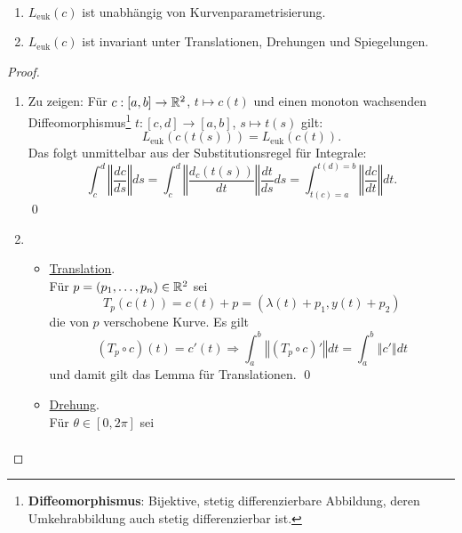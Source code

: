 \begin{lemma}
  \label{lm:leuklinvarianz} \
  \begin{enumerate}
    \item $ L_\text{euk}(c) $ ist unabhängig von Kurvenparametrisierung.
    \item $ L_\text{euk}(c) $ ist invariant unter Translationen, Drehungen und Spiegelungen.
  \end{enumerate}
  \begin{proof}
    \
    \begin{enumerate}
      \item Zu zeigen: Für $ c: [a,b] \to \mathbb{R}^2 $, $ t \mapsto c(t) $ und einen monoton wachsenden Diffeomorphismus\footnote{\textbf{Diffeomorphismus}: Bijektive, stetig differenzierbare Abbildung, deren Umkehrabbildung auch stetig differenzierbar ist.} $ t: [c, d] \to [a,b] $, $ s \mapsto t(s) $ gilt:
      \begin{equation*}
        L_\text{euk}(c(t(s))) = L_\text{euk}(c(t))\text{.}
      \end{equation*}
      Das folgt unmittelbar aus der Substitutionsregel für Integrale:
      \begin{equation*}
        \int_c^d \left\Vert \frac{dc}{ds} \right\Vert ds = \int_c^d \left\Vert \frac{d_c(t(s))}{dt} \right\Vert \frac{dt}{ds}ds = \int_{t(c) = a}^{t(d)=b} \left\Vert \frac{dc}{dt} \right\Vert dt \text{.}
      \end{equation*}\qed
      \item \begin{itemize}
        \item \underline{Translation}. \\ Für $ p = (p_1, \dots, p_n) \in \mathbb{R}^2 $ sei
        \begin{equation*}
           T_p(c(t)) = c(t) + p = (\lambda(t) + p_1, y(t) + p_2)
         \end{equation*} 
         die von $ p $ verschobene Kurve. Es gilt
         \begin{equation*}
           (T_p \circ c)(t) = c'(t) \Rightarrow \int_a^b \left\Vert (T_p \circ c)' \right\Vert dt = \int_a^b \left\Vert c' \right\Vert dt
         \end{equation*}
         und damit gilt das Lemma für Translationen. \qed
        \item \underline{Drehung}. \\
        Für $ \theta \in [0,2\pi] $ sei
        \begin{align*}

\end{align*}
\end{itemize}
\end{enumerate}
\end{proof}
\end{lemma}
